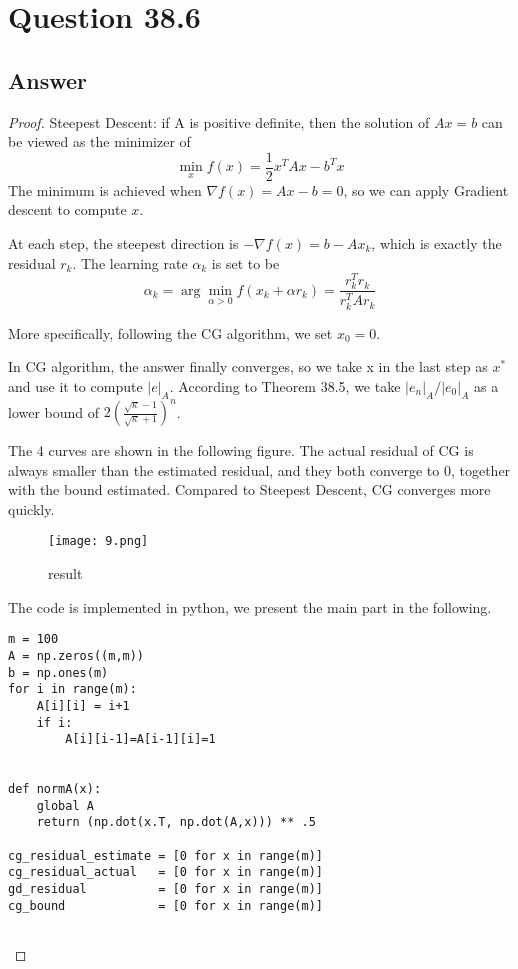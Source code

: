 \documentclass[letterpaper,11pt\iffalse ,draft\fi]{article}
\begin{document}
\newpage

\section*{Question 38.6}

\subsection*{Answer}
\begin{proof}

Steepest Descent: if A is positive definite, then the solution of $Ax=b$ can be viewed as the minimizer of $$\min_{x} f(x)=\frac 12x^TAx-b^Tx$$
The minimum is achieved when $\nabla f(x)=Ax-b=0$, so we can apply Gradient descent to compute $x$.

At each step, the steepest direction is $-\nabla f(x)=b-Ax_k$, which is exactly the residual $r_k$. The learning rate $\alpha_k$ is set to be $$\alpha_k =  \arg\min_{\alpha>0} f(x_k+\alpha r_k) = 
\frac {r_k^Tr_k}{r_k^TAr_k}$$

More specifically, following the CG algorithm, we set $x_0=0$.

In CG algorithm, the answer finally converges, so we take x in the last step as $x^*$ and use it to compute $|e|_A$. According to Theorem 38.5, we take $|e_n|_A / |e_0|_A$ as a lower bound of $2(\frac {\sqrt{\kappa}-1}{\sqrt{\kappa}+1})^n$.

The 4 curves are shown in the following figure. The actual residual of CG is always smaller than the estimated residual, and they both converge to 0, together with the bound estimated. Compared to Steepest Descent, CG converges more quickly.

\begin{figure}[htb] \centering 
    \texttt{[image: 9.png]}
    \caption{result}
    \end{figure}
    
The code is implemented in python, we present the main part in the following.


\begin{lstlisting}
m = 100
A = np.zeros((m,m))
b = np.ones(m)
for i in range(m):
    A[i][i] = i+1
    if i:
        A[i][i-1]=A[i-1][i]=1


def normA(x):
    global A
    return (np.dot(x.T, np.dot(A,x))) ** .5

cg_residual_estimate = [0 for x in range(m)]
cg_residual_actual   = [0 for x in range(m)]
gd_residual          = [0 for x in range(m)]
cg_bound             = [0 for x in range(m)]


\end{lstlisting}
\end{proof}
\end{document}
